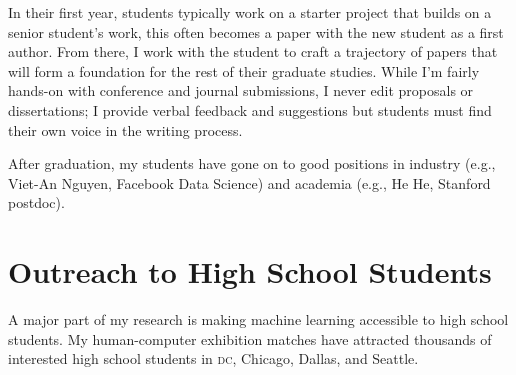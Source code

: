 \documentclass[11pt]{amsart}
\newcommand{\student}[1]{\vspace{.5cm}\fbox{\parbox{0.95\linewidth}{{\small #1}}}\vspace{.5cm}}
\newcommand{\abr}[1]{\textsc{#1}}
\begin{document}
In their first year, students typically work on a starter project that
builds on a senior student's work, this often becomes a paper with the
new student as a first author.  From there, I work with the student to
craft a trajectory of papers that will form a foundation for the rest
of their graduate studies.  While I'm fairly hands-on with conference
and journal submissions, I never edit proposals or dissertations; I
provide verbal feedback and suggestions but students must find their
own voice in the writing process.  

After graduation, my students have gone on to good positions in
industry (e.g., Viet-An Nguyen, Facebook Data Science) and academia
(e.g., He He, Stanford postdoc).

\section{Outreach to High School Students}

A major part of my research is making machine learning accessible to high school
students.  My human-computer exhibition matches have attracted thousands of
interested high school students in \abr{dc}, Chicago, Dallas, and Seattle.





\end{document}
